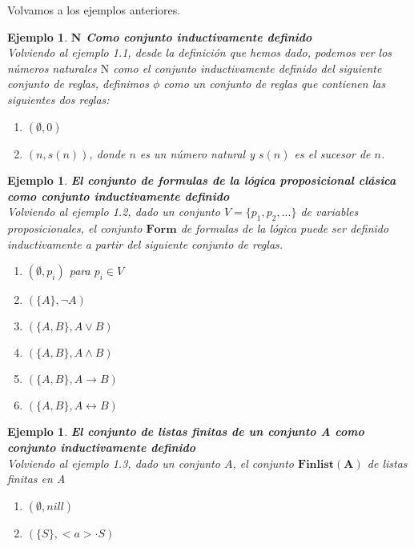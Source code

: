 \documentclass[executivepaper]{article}
\newtheorem{ejemplo}[propo]{Ejemplo}
\begin{document}
Volvamos a los ejemplos anteriores.

\begin{ejemplo}\textbf{$\mathbf{N}$ Como conjunto inductivamente definido}\\
Volviendo al ejemplo 1.1, desde la definición que hemos dado, podemos ver los números naturales $\mathrm{N}$ como el conjunto inductivamente definido del siguiente conjunto de reglas, definimos $\phi$ como un conjunto de reglas que contienen las siguientes dos reglas:
\begin{enumerate}
\item $(\emptyset,0)$
\item $({n},s(n))$, donde $n$ es un número natural y $s(n)$ es el sucesor de $n$.
\end{enumerate}
\end{ejemplo}

\begin{ejemplo}\textbf{El conjunto de formulas de la lógica proposicional clásica como conjunto inductivamente definido}\\
Volviendo al ejemplo 1.2, dado un conjunto $V = \{p_1, p_2,...\}$ de variables proposicionales, el conjunto $\mathbf{Form}$ de formulas de la lógica puede ser definido inductivamente a partir del siguiente conjunto de reglas. 
    \begin{enumerate}
        \item $(\emptyset, p_i)$ para $p_i \in V$
        \item $(\{A\}, \neg A)$
        \item $(\{A, B\}, A \lor B)$
        \item $(\{A, B\}, A \land B)$
        \item $(\{A, B\}, A \rightarrow B)$
        \item $(\{A, B\}, A \leftrightarrow B)$
    \end{enumerate}
\end{ejemplo}

\begin{ejemplo}\textbf{El conjunto de listas finitas de un conjunto A como conjunto inductivamente definido}\\
Volviendo al ejemplo 1.3, dado un conjunto $A$, el conjunto $\mathbf{Finlist(A)}$ de listas finitas en A
    \begin{enumerate}
        \item $(\emptyset, nill)$
        \item $(\{S\},<a>\cdot S)$ 
    \end{enumerate}
\end{ejemplo}
\end{document}
